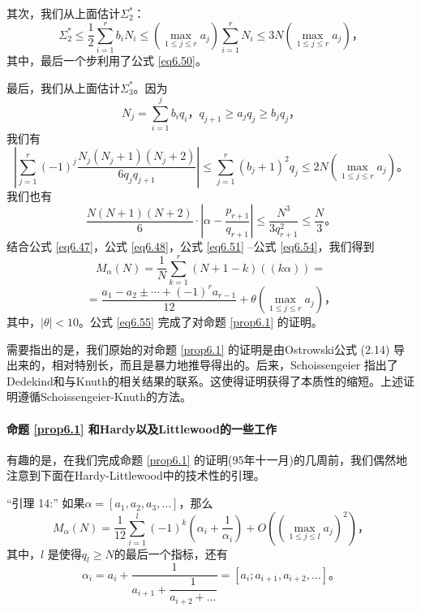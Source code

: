 \documentclass[11pt,a4paper]{article}
\theoremstyle{definition}
\newcommand{\refeq}[1]{公式 \ref{#1}}
\newcommand{\refprop}[1]{命题 \ref{#1}}
\numberwithin{equation}{section}
\newcommand{\comma}{\text{，}}
\newcommand{\juhao}{\text{。}}
\newcommand{\conalpha}{$ \alpha=\left[a_{1},a_{2},a_{3},\ldots\right] $}
\newcommand{\myone}[1]{\left(-1\right)^{#1}}
\newcommand{\QEDopen}{{\setlength{\fboxsep}{0pt}\setlength{\fboxrule}{0.2pt}\fbox{\rule[0pt]{0pt}{1.3ex}\rule[0pt]{1.3ex}{0pt}}}}
\newcommand{\ddbrace}[1]{\left(\left(#1\right)\right)}
\begin{document}
其次，我们从上面估计$ \Sigma_{2}^{\ast} $：
\begin{equation}\label{eq6.52}
	\Sigma_{2}^{\ast}\leq\dfrac{1}{2}\sum_{i=1}^{r}b_{i}N_{i}\leq\left(\underset{1\leq j\leq r}{\max}a_{j}\right)\sum_{i=1}^{r}N_{i}\leq3N\left(\underset{1\leq j\leq r}{\max}a_{j}\right)\comma
\end{equation}
其中，最后一个步利用了\refeq{eq6.50}。

最后，我们从上面估计$ \Sigma_{3}^{\ast} $。因为
\[ N_{j}=\sum_{i=1}^{j}b_{i}q_{i}\comma q_{j+1}\geq a_{j}q_{j} \geq b_{j}q_{j}\comma \]
我们有
\begin{equation}\label{eq6.53}
\left \lvert\sum_{j=1}^{r}\myone{j}\dfrac{N_{j}\left(N_{j}+1\right)\left(N_{j}+2\right)}{6q_{j}q_{j+1}}\right \rvert\leq\sum_{j=1}^{r}\left(b_{j}+1\right)^{2}q_{j}\leq2N\left(\underset{1\leq j\leq r}{\max}a_{j}\right)\juhao
\end{equation}
我们也有
\begin{equation}\label{eq6.54}
	\dfrac{N\left(N+1\right)\left(N+2\right)}{6}\cdot\left \lvert\alpha-\dfrac{p_{r+1}}{q_{r+1}}\right \rvert\leq\dfrac{N^{3}}{3q_{r+1}^{2}}\leq\dfrac{N}{3}\juhao
\end{equation}
结合\refeq{eq6.47}，\refeq{eq6.48}，\refeq{eq6.51} --\refeq{eq6.54}，我们得到
\[ M_{\alpha}\left(N\right)=\dfrac{1}{N}\sum_{k=1}^{r}\left(N+1-k\right)\ddbrace{k\alpha}= \]
\begin{equation}\label{eq6.55}
=\dfrac{a_{1}-a_{2}\pm\cdots+\myone{r}a_{r-1}}{12}+\theta\left(\underset{1\leq j\leq r}{\max}a_{j}\right)\comma
\end{equation}
其中，$ \lvert\theta\rvert<10 $。\refeq{eq6.55} 完成了对\refprop{prop6.1}  的证明。\hfill\QEDopen

需要指出的是，我们原始的对\refprop{prop6.1} 的证明是由Ostrowski公式 (2.14) 导出来的，相对特别长，而且是暴力地推导得出的。后来，Schoissengeier\cite{Scho} 指出了Dedekind和与Knuth\cite{Kn1}的相关结果的联系。这使得证明获得了本质性的缩短。上述证明遵循Schoissengeier-Knuth的方法。

\paragraph{\refprop{prop6.1} 和Hardy以及Littlewood的一些工作} 有趣的是，在我们完成\refprop{prop6.1} 的证明(95年十一月)的几周前，我们偶然地注意到下面在Hardy-Littlewood\cite{Ha-Li2}中的技术性的引理。

``引理 14:'' \qquad 如果\conalpha，那么
\begin{equation}\label{eq6.56}
	M_{\alpha}\left(N\right)=\dfrac{1}{12}\sum_{i=1}^{l}\myone{k}\left(\alpha_{i}+\dfrac{1}{\alpha_{i}}\right)+O\left((\underset{1\leq j\leq l}{\max}a_{j})^{2}\right)\comma
\end{equation}
其中，$ l $ 是使得$ q_{l}\geq N $的最后一个指标，还有
\begin{equation*}
\alpha_{i}=a_{i}+\dfrac{1}{a_{i+1}+\dfrac{1}{a_{i+2}+\ldots}}=\left[a_{i};a_{i+1},a_{i+2},\ldots\right]\juhao
\end{equation*}
\end{document}
